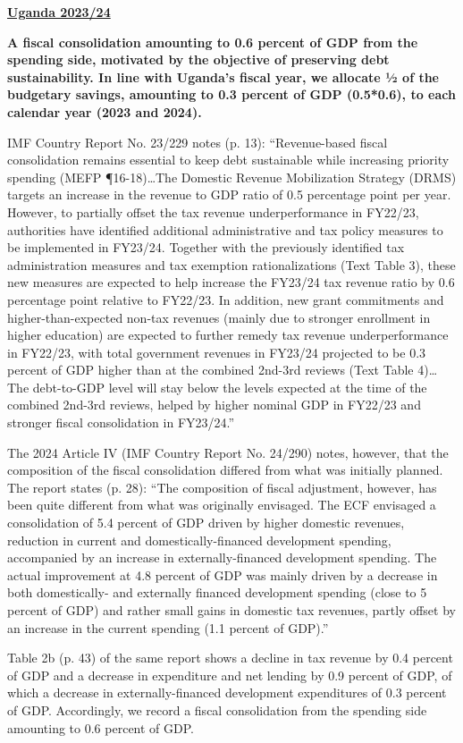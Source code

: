 \textbf{\underline{Uganda 2023/24}}

\textbf{A fiscal consolidation amounting to 0.6 percent of GDP from the spending side, motivated by the objective of preserving debt sustainability. In line with Uganda’s fiscal year, we allocate ½ of the budgetary savings, amounting to 0.3 percent of GDP (0.5*0.6), to each calendar year (2023 and 2024).}

IMF Country Report No. 23/229 notes (p. 13): “Revenue-based fiscal consolidation remains essential to keep debt sustainable while increasing priority spending (MEFP ¶16-18)…The Domestic Revenue Mobilization Strategy (DRMS) targets an increase in the revenue to GDP ratio of 0.5 percentage point per year. However, to partially offset the tax revenue underperformance in FY22/23, authorities have identified additional administrative and tax policy measures to be implemented in FY23/24. Together with the previously identified tax administration measures and tax exemption rationalizations (Text Table 3), these new measures are expected to help increase the FY23/24 tax revenue ratio by 0.6 percentage point relative to FY22/23. In addition, new grant commitments and higher-than-expected non-tax revenues (mainly due to stronger enrollment in higher education) are expected to further remedy tax revenue underperformance in FY22/23, with total government revenues in FY23/24 projected to be 0.3 percent of GDP higher than at the combined 2nd-3rd reviews (Text Table 4)…The debt-to-GDP level will stay below the levels expected at the time of the combined 2nd-3rd reviews, helped by higher nominal GDP in FY22/23 and stronger fiscal consolidation in FY23/24.”

The 2024 Article IV (IMF Country Report No. 24/290) notes, however, that the composition of the fiscal consolidation differed from what was initially planned. The report states (p. 28): “The composition of fiscal adjustment, however, has been quite different from what was originally envisaged. The ECF envisaged a consolidation of 5.4 percent of GDP driven by higher domestic revenues, reduction in current and domestically-financed development spending, accompanied by an increase in externally-financed development spending. The actual improvement at 4.8 percent of GDP was mainly driven by a decrease in both domestically- and externally financed development spending (close to 5 percent of GDP) and rather small gains in domestic tax revenues, partly offset by an increase in the current spending (1.1 percent of GDP).”

Table 2b (p. 43) of the same report shows a decline in tax revenue by 0.4 percent of GDP and a decrease in expenditure and net lending by 0.9 percent of GDP, of which a decrease in externally-financed development expenditures of 0.3 percent of GDP. Accordingly, we record a fiscal consolidation from the spending side amounting to 0.6 percent of GDP.

